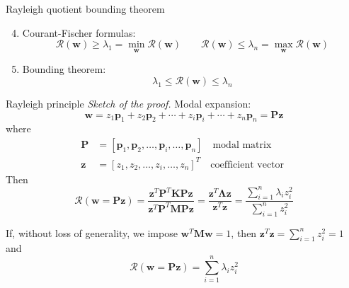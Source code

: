 \documentclass[aspectratio=169]{beamer}
\begin{document}
\begin{frame}{Rayleigh quotient bounding theorem}
  \begin{block}{}
    \begin{enumerate}
      \setcounter{enumi}{3}
      \item Courant-Fischer formulas:
            \[
              \mathcal{R}(\mathbf{w}) \geq \lambda_1 = \min_{\mathbf{w}} \mathcal{R}(\mathbf{w}) \qquad
              \mathcal{R}(\mathbf{w}) \leq \lambda_n = \max_{\mathbf{w}} \mathcal{R}(\mathbf{w})
            \]
      \item Bounding theorem:
            \[
              \lambda_1 \leq \mathcal{R}(\mathbf{w}) \leq \lambda_n
            \]
    \end{enumerate}
  \end{block}
\end{frame}

\begin{frame}{Rayleigh principle}
  \emph{Sketch of the proof.}  Modal expansion:
  \[
    \mathbf{w} = z_1 \mathbf{p}_1 + z_2 \mathbf{p}_2 + \cdots + z_i \mathbf{p}_i + \cdots + z_n \mathbf{p}_n = \mathbf{Pz}
  \]
  where
  \begin{align*}
    \mathbf{P} & = [\mathbf{p}_1, \mathbf{p}_2, \dots, \mathbf{p}_i, \dots, \mathbf{p}_n] \quad \text{modal matrix} \\
    \mathbf{z} & = [z_1, z_2, \dots, z_i, \dots, z_n]^T \quad \text{coefficient vector }
  \end{align*}
  Then
  \[
    \mathcal{R}(\mathbf{w} = \mathbf{Pz}) = \frac{\mathbf{z}^T \mathbf{P}^T \mathbf{K} \mathbf{Pz}}{\mathbf{z}^T \mathbf{P}^T \mathbf{M} \mathbf{Pz}} = \frac{\mathbf{z}^T \mathbf{\Lambda} \mathbf{z}}{\mathbf{z}^T \mathbf{z}} =
    \frac{\sum_{i=1}^n \lambda_i z_i^2}{\sum_{i=1}^n z_i^2}
  \]

  \bigskip
  If, without loss of generality, we impose \( \mathbf{w}^T \mathbf{M} \mathbf{w} = 1 \), then $ \mathbf{z}^T \mathbf{z} = \sum_{i=1}^n z_i^2 = 1$ and
  $$ \mathcal{R}(\mathbf{w} = \mathbf{Pz}) = \sum_{i=1}^n \lambda_i z_i^2 $$

\end{frame}
\end{document}
